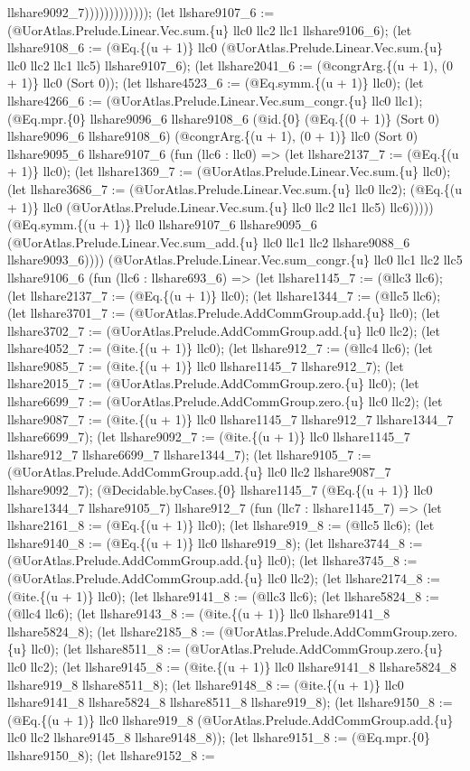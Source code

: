 \documentclass[11pt]{article}
\begin{document}
llshare9092\_7))))))))))))); (let llshare9107\_6 := (@UorAtlas.Prelude.Linear.Vec.sum.\{u\} llc0 llc2 llc1 llshare9106\_6); (let llshare9108\_6 := (@Eq.\{(u + 1)\} llc0 (@UorAtlas.Prelude.Linear.Vec.sum.\{u\} llc0 llc2 llc1 llc5) llshare9107\_6); (let llshare2041\_6 := (@congrArg.\{(u + 1), (0 + 1)\} llc0 (Sort 0)); (let llshare4523\_6 := (@Eq.symm.\{(u + 1)\} llc0); (let llshare4266\_6 := (@UorAtlas.Prelude.Linear.Vec.sum\_congr.\{u\} llc0 llc1); (@Eq.mpr.\{0\} llshare9096\_6 llshare9108\_6 (@id.\{0\} (@Eq.\{(0 + 1)\} (Sort 0) llshare9096\_6 llshare9108\_6) (@congrArg.\{(u + 1), (0 + 1)\} llc0 (Sort 0) llshare9095\_6 llshare9107\_6 (fun (llc6 : llc0) => (let llshare2137\_7 := (@Eq.\{(u + 1)\} llc0); (let llshare1369\_7 := (@UorAtlas.Prelude.Linear.Vec.sum.\{u\} llc0); (let llshare3686\_7 := (@UorAtlas.Prelude.Linear.Vec.sum.\{u\} llc0 llc2); (@Eq.\{(u + 1)\} llc0 (@UorAtlas.Prelude.Linear.Vec.sum.\{u\} llc0 llc2 llc1 llc5) llc6))))) (@Eq.symm.\{(u + 1)\} llc0 llshare9107\_6 llshare9095\_6 (@UorAtlas.Prelude.Linear.Vec.sum\_add.\{u\} llc0 llc1 llc2 llshare9088\_6 llshare9093\_6)))) (@UorAtlas.Prelude.Linear.Vec.sum\_congr.\{u\} llc0 llc1 llc2 llc5 llshare9106\_6 (fun (llc6 : llshare693\_6) => (let llshare1145\_7 := (@llc3 llc6); (let llshare2137\_7 := (@Eq.\{(u + 1)\} llc0); (let llshare1344\_7 := (@llc5 llc6); (let llshare3701\_7 := (@UorAtlas.Prelude.AddCommGroup.add.\{u\} llc0); (let llshare3702\_7 := (@UorAtlas.Prelude.AddCommGroup.add.\{u\} llc0 llc2); (let llshare4052\_7 := (@ite.\{(u + 1)\} llc0); (let llshare912\_7 := (@llc4 llc6); (let llshare9085\_7 := (@ite.\{(u + 1)\} llc0 llshare1145\_7 llshare912\_7); (let llshare2015\_7 := (@UorAtlas.Prelude.AddCommGroup.zero.\{u\} llc0); (let llshare6699\_7 := (@UorAtlas.Prelude.AddCommGroup.zero.\{u\} llc0 llc2); (let llshare9087\_7 := (@ite.\{(u + 1)\} llc0 llshare1145\_7 llshare912\_7 llshare1344\_7 llshare6699\_7); (let llshare9092\_7 := (@ite.\{(u + 1)\} llc0 llshare1145\_7 llshare912\_7 llshare6699\_7 llshare1344\_7); (let llshare9105\_7 := (@UorAtlas.Prelude.AddCommGroup.add.\{u\} llc0 llc2 llshare9087\_7 llshare9092\_7); (@Decidable.byCases.\{0\} llshare1145\_7 (@Eq.\{(u + 1)\} llc0 llshare1344\_7 llshare9105\_7) llshare912\_7 (fun (llc7 : llshare1145\_7) => (let llshare2161\_8 := (@Eq.\{(u + 1)\} llc0); (let llshare919\_8 := (@llc5 llc6); (let llshare9140\_8 := (@Eq.\{(u + 1)\} llc0 llshare919\_8); (let llshare3744\_8 := (@UorAtlas.Prelude.AddCommGroup.add.\{u\} llc0); (let llshare3745\_8 := (@UorAtlas.Prelude.AddCommGroup.add.\{u\} llc0 llc2); (let llshare2174\_8 := (@ite.\{(u + 1)\} llc0); (let llshare9141\_8 := (@llc3 llc6); (let llshare5824\_8 := (@llc4 llc6); (let llshare9143\_8 := (@ite.\{(u + 1)\} llc0 llshare9141\_8 llshare5824\_8); (let llshare2185\_8 := (@UorAtlas.Prelude.AddCommGroup.zero.\{u\} llc0); (let llshare8511\_8 := (@UorAtlas.Prelude.AddCommGroup.zero.\{u\} llc0 llc2); (let llshare9145\_8 := (@ite.\{(u + 1)\} llc0 llshare9141\_8 llshare5824\_8 llshare919\_8 llshare8511\_8); (let llshare9148\_8 := (@ite.\{(u + 1)\} llc0 llshare9141\_8 llshare5824\_8 llshare8511\_8 llshare919\_8); (let llshare9150\_8 := (@Eq.\{(u + 1)\} llc0 llshare919\_8 (@UorAtlas.Prelude.AddCommGroup.add.\{u\} llc0 llc2 llshare9145\_8 llshare9148\_8)); (let llshare9151\_8 := (@Eq.mpr.\{0\} llshare9150\_8); (let llshare9152\_8 := 
\end{document}
